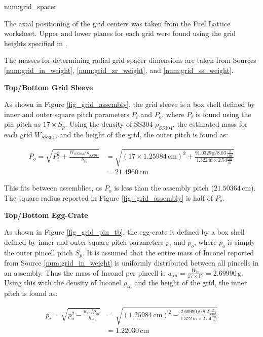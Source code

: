 \begin{numitem}{num:grid_spacer}

  The axial positioning of the grid centers was taken from the Fuel Lattice
  worksheet. Upper and lower planes for each grid were found using the grid
  heights specified in \cite{ml033530020}.
  
  The masses for determining radial grid spacer dimensions are taken from
  Sources \ref{num:grid_in_weight}, \ref{num:grid_zr_weight}, and
  \ref{num:grid_ss_weight}.
  
  \textbf{Top/Bottom Grid Sleeve}
  
  As shown in Figure \ref{fig_grid_assembly}, the grid sleeve is a box shell
  defined by inner and outer square pitch parameters $P_i$ and $P_o$, where
  $P_i$ is found using the pin pitch as $17\times S_p$.  Using the density of
  SS304 $\rho_{SS304}$, the estimated mass for each grid $W_{SS304}$, and the
  height of the grid, the outer pitch is found as:
  
\[
  \begin{aligned}
    P_o = \sqrt{P_i^2 + \frac{W_{SS304}/\rho_{SS304}}{h_{tb}}} &=
          \sqrt{(17\times1.25984\,\mathrm{cm})^2 +
          \frac{91.0329\,\mathrm{g}/8.03\,\frac{\mathrm{g}}{\mathrm{cm}^3}}{1.322\,
          \mathrm{in}\times2.54\mathrm{\frac{cm}{in}}}} \\
        & = 21.4960\,\mathrm{cm}
  \end{aligned}
\]

  This fits between assemblies, as $P_o$ is less than the assembly pitch
  ($21.50364\,\mathrm{cm}$). The square radius reported in Figure
  \ref{fig_grid_assembly} is half of $P_o$.

  \textbf{Top/Bottom Egg-Crate}
  
  As shown in Figure \ref{fig_grid_pin_tb}, the egg-crate is defined by a box
  shell defined by inner and outer square pitch parameters $p_i$ and $p_o$,
  where $p_o$ is simply the outer pincell pitch $S_p$. It is assumed that the
  entire mass of Inconel reported from Source \ref{num:grid_in_weight} is
  uniformly distributed between all pincells in an assembly. Thus the mass of
  Inconel per pincell is $w_{in} = \frac{W_{in}}{17\times17} =
  2.69990\,\mathrm{g}$. Using this with the density of Inconel $\rho_{in}$ and
  the height of the grid, the inner pitch is found as:
  
\[
  \begin{aligned}
    p_i = \sqrt{p_o^2 - \frac{w_{in}/\rho_{in}}{h_{tb}}} &=
          \sqrt{(1.25984\,\mathrm{cm})^2 -
          \frac{2.69990\,\mathrm{g}/8.2\,\frac{\mathrm{g}}{\mathrm{cm}^3}}{1.322\,
          \mathrm{in}\times2.54\mathrm{\frac{cm}{in}}}} \\
        & = 1.22030\,\mathrm{cm}
  \end{aligned}
\]


\end{numitem}
